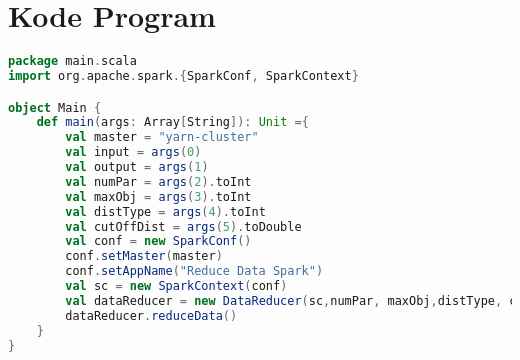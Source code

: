 \chapter{Kode Program}
\label{lamp:A}

%
%
%


\begin{lstlisting}[language=Scala, caption=Main.scala]
package main.scala
import org.apache.spark.{SparkConf, SparkContext}

object Main {
    def main(args: Array[String]): Unit ={
        val master = "yarn-cluster"
        val input = args(0)
        val output = args(1)
        val numPar = args(2).toInt
        val maxObj = args(3).toInt
        val distType = args(4).toInt
        val cutOffDist = args(5).toDouble
        val conf = new SparkConf()
        conf.setMaster(master)
        conf.setAppName("Reduce Data Spark")
        val sc = new SparkContext(conf)
        val dataReducer = new DataReducer(sc,numPar, maxObj,distType, cutOffDist, input, output)
        dataReducer.reduceData()
    }
}
\end{lstlisting}


